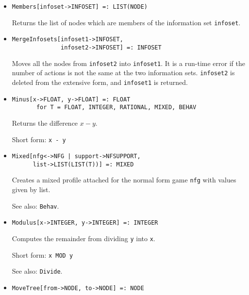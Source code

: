 \begin{itemize}
\item
\protect \large \begin{verbatim}
Members[infoset->INFOSET] =: LIST(NODE)
\end{verbatim}\normalsize

\bd
Returns the list of nodes which are members of the information
set \verb+infoset+.
\ed

\item
\protect \large \begin{verbatim}
MergeInfosets[infoset1->INFOSET,
              infoset2->INFOSET] =: INFOSET
\end{verbatim}\normalsize

\bd
Moves all the nodes from \verb+infoset2+ into \verb+infoset1+.
It is a run-time error if the number of actions is not the same at the
two information sets.  \verb+infoset2+ is deleted from the extensive form,
and \verb+infoset1+ is returned.
\ed

\item 
\protect \large \begin{verbatim}
Minus[x->FLOAT, y->FLOAT] =: FLOAT
       for T = FLOAT, INTEGER, RATIONAL, MIXED, BEHAV
\end{verbatim} \normalsize

\bd
Returns the difference $x - y$.
\item
[Short form:] \verb+x - y+
\ed

\item
\protect \large \begin{verbatim}
Mixed[nfg<->NFG | support->NFSUPPORT, 
      list->LIST(LIST(T))] =: MIXED
\end{verbatim}\normalsize

\bd
Creates a mixed profile attached for the normal form game \verb+nfg+
with values given by list.  
\item
[See also:] {\tt Behav}.
\ed


\item
\protect \large \begin{verbatim}
Modulus[x->INTEGER, y->INTEGER] =: INTEGER
\end{verbatim}\normalsize

\bd
Computes the remainder from dividing \verb+y+ into \verb+x+.
\item
[Short form:] \verb+x MOD y+
\item
[See also:] {\tt Divide}.
\ed


\item
\protect \large \begin{verbatim}
MoveTree[from->NODE, to->NODE] =: NODE
\end{verbatim}\normalsize


\end{itemize}
